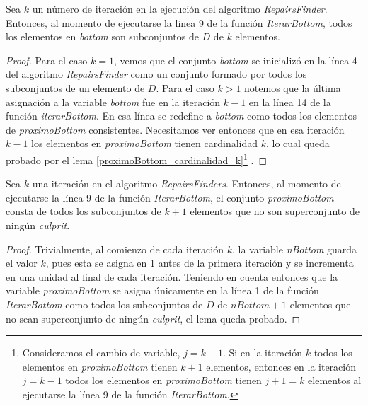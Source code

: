 \documentclass[11pt,a4paper,twoside]{tesis}
\begin{document}
\begin{lemma}\label{bottom_cardinalidad_k}
Sea $k$ un número de iteración en la ejecución del algoritmo \textit{RepairsFinder}. Entonces, al momento de ejecutarse la linea 9 de la función \textit{IterarBottom}, todos los elementos en \textit{bottom} son subconjuntos de $D$ de $k$ elementos.
\end{lemma}

\begin{proof}
Para el caso $k = 1$, vemos que el conjunto \textit{bottom} se inicializó en la línea 4 del algoritmo \textit{RepairsFinder} como un conjunto formado por todos los subconjuntos de un elemento de $D$. Para el caso $k>1$ notemos que la última asignación a la variable \textit{bottom} fue en la iteración $k-1$ en la línea 14 de la función \textit{iterarBottom}. En esa línea se redefine a \textit{bottom} como todos los elementos de \textit{proximoBottom} consistentes. Necesitamos ver entonces que en esa iteración $k-1$ los elementos en \textit{proximoBottom} tienen cardinalidad $k$, lo cual queda probado por el lema \ref{proximoBottom_cardinalidad_k}\footnote{Consideramos el cambio de variable, $j = k-1$. Si en la iteración $k$ todos los elementos en \textit{proximoBottom} tienen $k+1$ elementos, entonces en la iteración $j = k-1$ todos los elementos en \textit{proximoBottom} tienen $j + 1 = k$ elementos al ejecutarse la línea 9 de la función \textit{IterarBottom}.} .
\end{proof}

\begin{lemma}\label{proximoBottom_cardinalidad_k}
Sea $k$ una iteración en el algoritmo \textit{RepairsFinders}. Entonces, al momento de ejecutarse la línea 9 de la función \textit{IterarBottom}, el conjunto \textit{proximoBottom} consta de todos los subconjuntos de $k + 1$ elementos que no son superconjunto de ningún \textit{culprit}.
\end{lemma}

\begin{proof}
Trivialmente, al comienzo de cada iteración $k$, la variable \textit{nBottom} guarda el valor $k$, pues esta se asigna en 1 antes de la primera iteración y se incrementa en una unidad al final de cada iteración. Teniendo en cuenta entonces que la variable \textit{proximoBottom} se asigna únicamente en la línea 1 de la función \textit{IterarBottom} como todos los subconjuntos de  $D$ de $nBottom + 1$ elementos que no sean superconjunto de ningún \textit{culprit}, el lema queda probado.
\end{proof}
\end{document}
